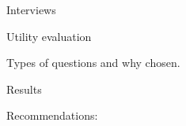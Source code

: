 

Interviews

Utility evaluation

Types of questions and why chosen. \cite{Walker2013Qualitative}

Results


Recommendations:
\cite{Carver2001_PPGIS_Cyberdemocracy} 